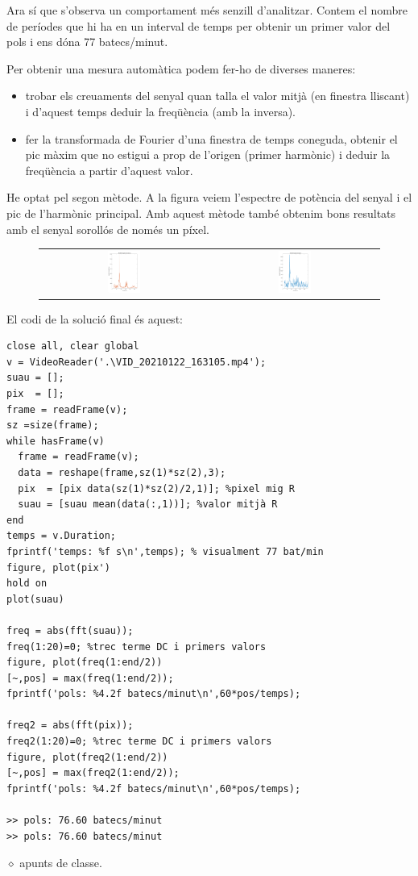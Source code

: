 \documentclass[a4paper,10pt,twocolumn]{article}
\begin{document}
Ara sí que s'observa un comportament més senzill d'analitzar. Contem el nombre de períodes que hi ha en un interval de temps per obtenir un primer valor del pols i ens dóna 77 batecs/minut.

Per obtenir una mesura automàtica podem fer-ho de diverses maneres:
\begin{itemize}
\item trobar els creuaments del senyal quan talla el valor mitjà (en finestra lliscant)  i d'aquest temps deduir la freqüència (amb la inversa).
\item fer la transformada de Fourier d'una finestra de temps coneguda, obtenir el pic màxim que no estigui a prop de l'origen (primer harmònic) i deduir la freqüència a partir d'aquest valor. 
\end{itemize}
He optat pel segon mètode. A la figura veiem l'espectre de potència del senyal i el pic de l'harmònic principal. Amb aquest mètode també obtenim bons resultats amb el senyal sorollós de només un píxel.
\begin{figure}[h]
\centering
\begin{tabular}{cc}
\includegraphics[width=0.2\textwidth]{fig3a.png} &
\includegraphics[width=0.2\textwidth]{fig3b.png} 
\end{tabular}
\end{figure}

El codi  de la solució final és aquest:

\begin{Verbatim}[fontsize=\small]
close all, clear global
v = VideoReader('.\VID_20210122_163105.mp4');
suau = [];
pix  = [];
frame = readFrame(v);
sz =size(frame);
while hasFrame(v)
  frame = readFrame(v);
  data = reshape(frame,sz(1)*sz(2),3);
  pix  = [pix data(sz(1)*sz(2)/2,1)]; %pixel mig R
  suau = [suau mean(data(:,1))]; %valor mitjà R
end
temps = v.Duration;
fprintf('temps: %f s\n',temps); % visualment 77 bat/min
figure, plot(pix')
hold on
plot(suau)

freq = abs(fft(suau));
freq(1:20)=0; %trec terme DC i primers valors
figure, plot(freq(1:end/2))
[~,pos] = max(freq(1:end/2));
fprintf('pols: %4.2f batecs/minut\n',60*pos/temps);

freq2 = abs(fft(pix));
freq2(1:20)=0; %trec terme DC i primers valors
figure, plot(freq2(1:end/2))
[~,pos] = max(freq2(1:end/2));
fprintf('pols: %4.2f batecs/minut\n',60*pos/temps);

>> pols: 76.60 batecs/minut
>> pols: 76.60 batecs/minut
\end{Verbatim}

\begin{thebibliography}{}
\item[$\diamond$] apunts de classe.
\end{thebibliography}		
\end{document}
